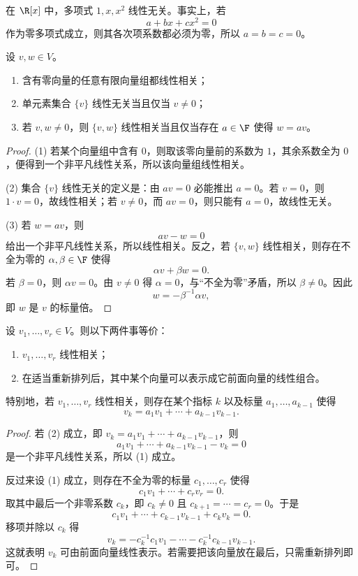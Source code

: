 \begin{example}
在 $\R[x]$ 中，多项式 $1,x,x^2$ 线性无关。事实上，若
\[
a+bx+cx^2=0
\]
作为零多项式成立，则其各次项系数都必须为零，所以 $a=b=c=0$。
\end{example}

\begin{proposition}
设 $v,w\in V$。
\begin{enumerate}[label=\textnormal{(\arabic*)}]
  \item 含有零向量的任意有限向量组都线性相关；
  \item 单元素集合 $\{v\}$ 线性无关当且仅当 $v\ne 0$；
  \item 若 $v,w\ne 0$，则 $\{v,w\}$ 线性相关当且仅当存在 $a\in\F$ 使得 $w=av$。
\end{enumerate}
\end{proposition}

\begin{proof}
(1) 若某个向量组中含有 $0$，则取该零向量前的系数为 $1$，其余系数全为 $0$，便得到一个非平凡线性关系，所以该向量组线性相关。

(2) 集合 $\{v\}$ 线性无关的定义是：由 $av=0$ 必能推出 $a=0$。若 $v=0$，则 $1\cdot v=0$，故线性相关；若 $v\ne 0$，而 $av=0$，则只能有 $a=0$，故线性无关。

(3) 若 $w=av$，则
\[
a v-w=0
\]
给出一个非平凡线性关系，所以线性相关。反之，若 $\{v,w\}$ 线性相关，则存在不全为零的 $\alpha,\beta\in\F$ 使得
\[
\alpha v+\beta w=0.
\]
若 $\beta=0$，则 $\alpha v=0$。由 $v\ne 0$ 得 $\alpha=0$，与“不全为零”矛盾，所以 $\beta\ne 0$。因此
\[
w=-\beta^{-1}\alpha v,
\]
即 $w$ 是 $v$ 的标量倍。
\end{proof}

\begin{theorem}[有限向量组的相关判别]
设 $v_1,\dots,v_r\in V$。则以下两件事等价：
\begin{enumerate}[label=\textnormal{(\arabic*)}]
  \item $v_1,\dots,v_r$ 线性相关；
  \item 在适当重新排列后，其中某个向量可以表示成它前面向量的线性组合。
\end{enumerate}
特别地，若 $v_1,\dots,v_r$ 线性相关，则存在某个指标 $k$ 以及标量 $a_1,\dots,a_{k-1}$ 使得
\[
v_k=a_1v_1+\cdots+a_{k-1}v_{k-1}.
\]
\end{theorem}

\begin{proof}
若 (2) 成立，即 $v_k=a_1v_1+\cdots+a_{k-1}v_{k-1}$，则
\[
a_1v_1+\cdots+a_{k-1}v_{k-1}-v_k=0
\]
是一个非平凡线性关系，所以 (1) 成立。

反过来设 (1) 成立，则存在不全为零的标量 $c_1,\dots,c_r$ 使得
\[
c_1v_1+\cdots+c_rv_r=0.
\]
取其中最后一个非零系数 $c_k$，即 $c_k\ne 0$ 且 $c_{k+1}=\cdots=c_r=0$。于是
\[
c_1v_1+\cdots+c_{k-1}v_{k-1}+c_kv_k=0.
\]
移项并除以 $c_k$ 得
\[
v_k=-c_k^{-1}c_1v_1-\cdots-c_k^{-1}c_{k-1}v_{k-1}.
\]
这就表明 $v_k$ 可由前面向量线性表示。若需要把该向量放在最后，只需重新排列即可。
\end{proof}

